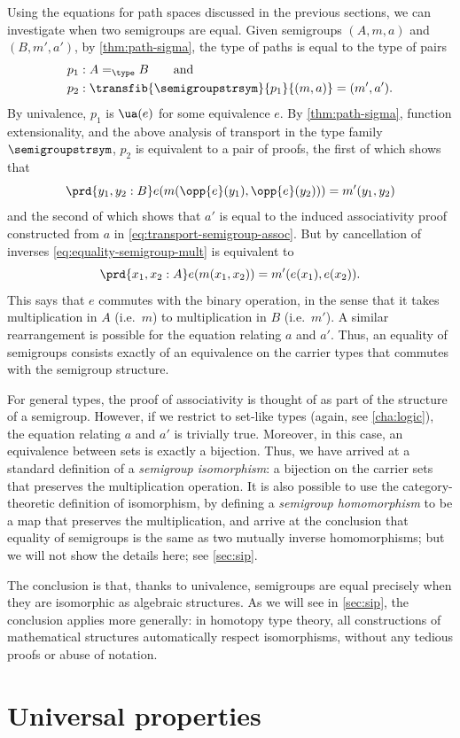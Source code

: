Using the equations for path spaces discussed in the previous sections,
we can investigate when two semigroups are equal. Given semigroups
$(A,m,a)$ and $(B,m',a')$, by \cref{thm:path-sigma}, the type of paths
is equal to the type of pairs
\begin{align*}
p_1 &: A =_{\type} B \qquad\text{and}\\
p_2 &: \transfib{\semigroupstrsym}{p_1}{(m,a)} = {(m',a')}.
\end{align*}
By univalence, $p_1$ is $\ua(e)$ for some equivalence $e$. By
\cref{thm:path-sigma}, function extensionality, and the above analysis of
transport in the type family $\semigroupstrsym$, $p_2$ is equivalent to a pair
of proofs, the first of which shows that
\begin{equation} \label{eq:equality-semigroup-mult}
\prd{y_1,y_2:B} e(m(\opp{e}(y_1), \opp{e}(y_2))) = m'(y_1,y_2)
\end{equation}
and the second of which shows that $a'$ is equal to the induced
associativity proof constructed from $a$ in
\eqref{eq:transport-semigroup-assoc}.  But by cancellation of inverses
\eqref{eq:equality-semigroup-mult} is equivalent to
\[
\prd{x_1,x_2:A} e(m(x_1, x_2)) = m'(e(x_1),e(x_2)).
\]
This says that $e$ commutes with the binary operation, in the sense
that it takes multiplication in $A$ (i.e.\ $m$) to multiplication in $B$
(i.e.\ $m'$).  A similar rearrangement is possible for the equation relating
$a$ and $a'$.  Thus, an equality of semigroups consists exactly of an
equivalence on the carrier types that commutes with the semigroup
structure.

For general types, the proof of associativity is thought of as part of
the structure of a semigroup.  However, if we restrict to set-like types
(again, see \cref{cha:logic}), the
equation relating $a$ and $a'$ is trivially true.  Moreover, in this
case, an equivalence between sets is exactly a bijection.  Thus, we have
arrived at a standard definition of a \emph{semigroup isomorphism}: a
bijection on the carrier sets that preserves the multiplication
operation.  It is also possible to use the category-theoretic definition
of isomorphism, by defining a \emph{semigroup homomorphism} to be a map
that preserves the multiplication, and arrive at the conclusion that equality of
semigroups is the same as two mutually inverse homomorphisms; but we
will not show the details here; see \cref{sec:sip}.

The conclusion is that, thanks to univalence, semigroups are equal
precisely when they are isomorphic as algebraic structures. As we will see in \cref{sec:sip}, the
conclusion applies more generally: in homotopy type theory, all constructions of
mathematical structures automatically respect isomorphisms, without any
tedious proofs or abuse of notation.

\section{Universal properties}
